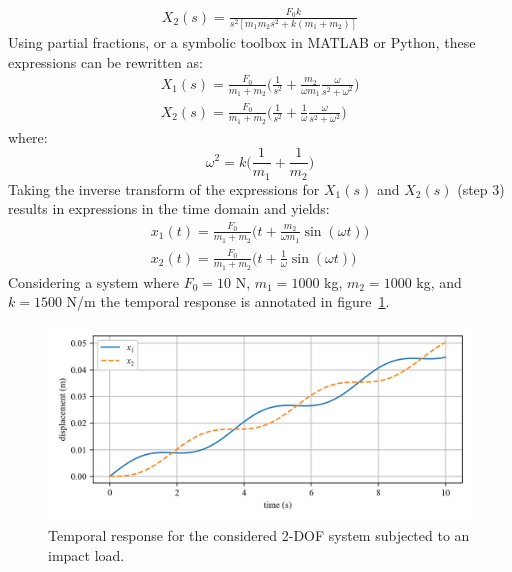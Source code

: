\documentclass[12pt,letter]{article}
\begin{document}
\begin{example}
\begin{eqnarray}
	X_2(s) = \frac{F_0 k}{s^2 [m_1 m_2 s^2 + k (m_1 + m_2)]} \nonumber
	\end{eqnarray}
	Using partial fractions, or a symbolic toolbox in MATLAB or Python, these expressions can be rewritten as:
	\begin{eqnarray}
	X_1(s) = \frac{F_0}{m_1 + m_2} \bigg( \frac{1}{s^2} + \frac{m_2}{\omega m_1} \frac{\omega}{s^2 + \omega^2} \bigg) \\
	X_2(s) = \frac{F_0}{m_1 + m_2} \bigg( \frac{1}{s^2} + \frac{1}{\omega} \frac{\omega}{s^2 + \omega^2} \bigg) \nonumber
	\end{eqnarray}
	where:
	\begin{equation}
	\omega^2 = k \bigg( \frac{1}{m_1} + \frac{1}{m_2} \bigg)
	\end{equation}
	Taking the inverse transform of the expressions for $X_1(s)$ and $X_2(s)$ (step 3) results in expressions in the time domain and yields:
	\begin{eqnarray}
	x_1(t) = \frac{F_0}{m_1 + m_2} \bigg( t + \frac{m_2}{\omega m_1} \sin (\omega t) \bigg) \\
	x_2(t) = \frac{F_0}{m_1 + m_2} \bigg( t + \frac{1}{\omega} \sin (\omega t) \bigg) \nonumber
	\end{eqnarray}
	Considering a system where $F_0=10$ N, $m_1=1000$ kg, $m_2=1000$ kg, and $k=1500$ N/m the temporal response is annotated in figure~\ref{fig:2_DOF_impact_example}. 
	
	
	\begin{figure}[H]
		\centering
		\includegraphics[width=\linewidth]{../figures/2_DOF_impact_example.png}
		\caption{Temporal response for the considered 2-DOF system subjected to an impact load.}
		\label{fig:2_DOF_impact_example}
	\end{figure}
	
	
	\end{example}
	
	
	
\end{document}
